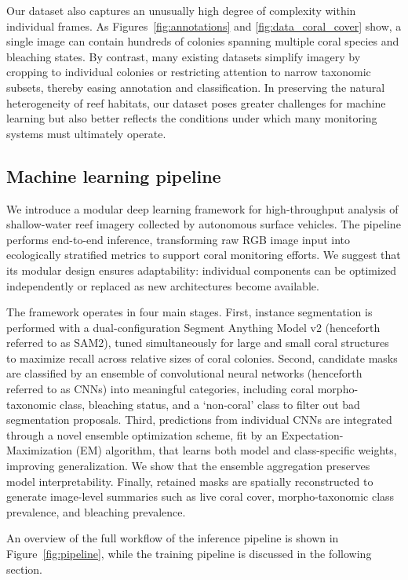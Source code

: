 \documentclass[11pt]{elsarticle}
\begin{document}
Our dataset also captures an unusually high degree of complexity within individual frames. As Figures~\ref{fig:annotations} and \ref{fig:data_coral_cover} show, a single image can contain hundreds of colonies spanning multiple coral species and bleaching states. By contrast, many existing datasets simplify imagery by cropping to individual colonies or restricting attention to narrow taxonomic subsets, thereby easing annotation and classification. In preserving the natural heterogeneity of reef habitats, our dataset poses greater challenges for machine learning but also better reflects the conditions under which many monitoring systems must ultimately operate.

\subsection{Machine learning pipeline}

We introduce a modular deep learning framework for high-throughput analysis of shallow-water reef imagery collected by autonomous surface vehicles. The pipeline performs end-to-end inference, transforming raw RGB image input into ecologically stratified metrics to support coral monitoring efforts. We suggest that its modular design ensures adaptability: individual components can be optimized independently or replaced as new architectures become available.

The framework operates in four main stages. First, instance segmentation is performed with a dual-configuration Segment Anything Model v2 (henceforth referred to as SAM2), tuned simultaneously for large and small coral structures to maximize recall across relative sizes of coral colonies. Second, candidate masks are classified by an ensemble of convolutional neural networks (henceforth referred to as CNNs) into meaningful categories, including coral morpho-taxonomic class, bleaching status, and a `non-coral' class to filter out bad segmentation proposals. Third, predictions from individual CNNs are integrated through a novel ensemble optimization scheme, fit by an Expectation-Maximization (EM) algorithm, that learns both model and class-specific weights, improving generalization. We show that the ensemble aggregation preserves model interpretability. Finally, retained masks are spatially reconstructed to generate image-level summaries such as live coral cover, morpho-taxonomic class prevalence, and bleaching prevalence.

An overview of the full workflow of the inference pipeline is shown in Figure~\ref{fig:pipeline}, while the training pipeline is discussed in the following section.
\end{document}
